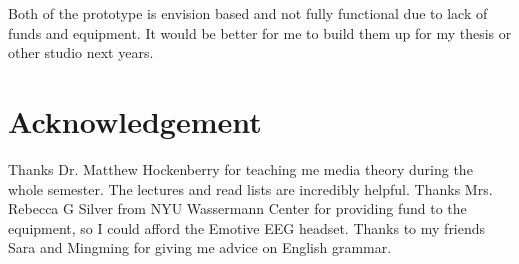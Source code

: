 \documentclass[a4paper]{article}
\begin{document}
Both of the prototype is envision based and not fully functional due to lack of funds and equipment. It would be better for me to build them up for my thesis or other studio next years.

\section{Acknowledgement}

Thanks Dr. Matthew Hockenberry for teaching me media theory during the whole semester. The lectures and read lists are incredibly helpful. Thanks Mrs. Rebecca G Silver from NYU Wassermann Center for providing fund to the equipment, so I could afford the Emotive EEG headset. Thanks to my friends Sara and Mingming for giving me advice on English grammar.

\printbibliography
\end{document}
